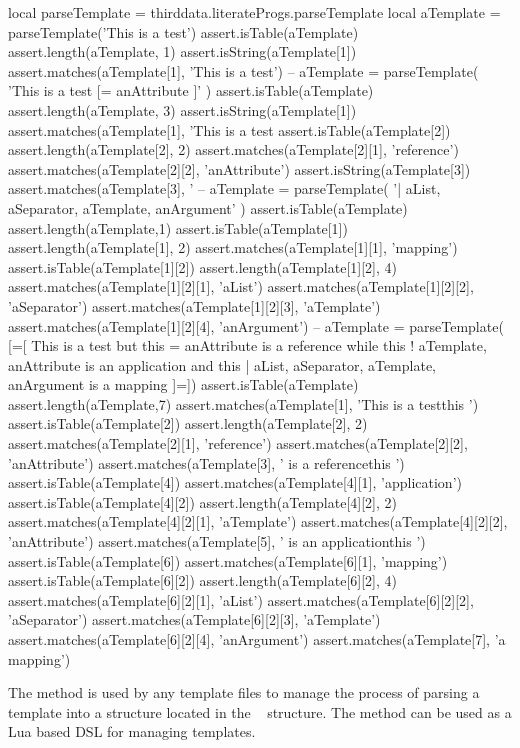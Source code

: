 {{\startLuaTest
local parseTemplate = thirddata.literateProgs.parseTemplate
local aTemplate = parseTemplate('This is a test')
assert.isTable(aTemplate)
assert.length(aTemplate, 1)
assert.isString(aTemplate[1])
assert.matches(aTemplate[1], 'This is a test')
--
aTemplate = parseTemplate(
  'This is a test [{{=  anAttribute  }}]'
)
assert.isTable(aTemplate)
assert.length(aTemplate, 3)
assert.isString(aTemplate[1])
assert.matches(aTemplate[1], 'This is a test %
assert.isTable(aTemplate[2])
assert.length(aTemplate[2], 2)
assert.matches(aTemplate[2][1], 'reference')
assert.matches(aTemplate[2][2], 'anAttribute')
assert.isString(aTemplate[3])
assert.matches(aTemplate[3], '%
--
aTemplate = parseTemplate(
  '{{| aList, aSeparator, aTemplate, anArgument}}'
)
assert.isTable(aTemplate)
assert.length(aTemplate,1)
assert.isTable(aTemplate[1])
assert.length(aTemplate[1], 2)
assert.matches(aTemplate[1][1], 'mapping')
assert.isTable(aTemplate[1][2])
assert.length(aTemplate[1][2], 4)
assert.matches(aTemplate[1][2][1], 'aList')
assert.matches(aTemplate[1][2][2], 'aSeparator')
assert.matches(aTemplate[1][2][3], 'aTemplate')
assert.matches(aTemplate[1][2][4], 'anArgument')
--
aTemplate = parseTemplate(
[=[
This is a test
but this {{= anAttribute }} is a reference
while this {{! aTemplate, anAttribute }} is an application
and this {{| aList, aSeparator, aTemplate, anArgument }}
is a mapping
]=])
assert.isTable(aTemplate)
assert.length(aTemplate,7)
assert.matches(aTemplate[1], 'This is a test\nbut this ')
assert.isTable(aTemplate[2])
assert.length(aTemplate[2], 2)
assert.matches(aTemplate[2][1], 'reference')
assert.matches(aTemplate[2][2], 'anAttribute')
assert.matches(aTemplate[3], ' is a reference\nwhile this ')
assert.isTable(aTemplate[4])
assert.matches(aTemplate[4][1], 'application')
assert.isTable(aTemplate[4][2])
assert.length(aTemplate[4][2], 2)
assert.matches(aTemplate[4][2][1], 'aTemplate')
assert.matches(aTemplate[4][2][2], 'anAttribute')
assert.matches(aTemplate[5], ' is an application\nand this ')
assert.isTable(aTemplate[6])
assert.matches(aTemplate[6][1], 'mapping')
assert.isTable(aTemplate[6][2])
assert.length(aTemplate[6][2], 4)
assert.matches(aTemplate[6][2][1], 'aList')
assert.matches(aTemplate[6][2][2], 'aSeparator')
assert.matches(aTemplate[6][2][3], 'aTemplate')
assert.matches(aTemplate[6][2][4], 'anArgument')
assert.matches(aTemplate[7], '\nis a mapping\n')
\stopLuaTest
\stopTestCase

\stopTestSuite

\startTestSuite[addTemplate]

The  method is used by any template files to manage the 
process of parsing a template into a structure located in the \ConTeXt\ 
 structure. The  method can be 
used as a Lua based DSL for managing templates. 

}}
